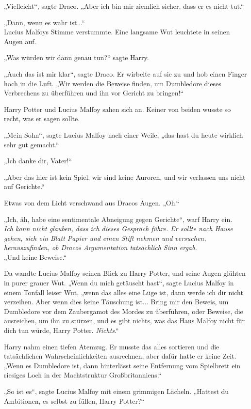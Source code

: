 {„Vielleicht“, sagte Draco. „Aber ich bin mir ziemlich sicher, dass er es nicht tut.“

„Dann, wenn es wahr ist...“\\ Lucius Malfoys Stimme verstummte. Eine langsame Wut leuchtete in seinen Augen auf.

„Was würden wir dann genau tun?“ sagte Harry.

„Auch das ist mir klar“, sagte Draco. Er wirbelte auf sie zu und hob einen Finger hoch in die Luft. „Wir werden die Beweise finden, um Dumbledore dieses Verbrechens zu überführen und ihn vor Gericht zu bringen!“

Harry Potter und Lucius Malfoy sahen sich an. Keiner von beiden wusste so recht, was er sagen sollte.

„Mein Sohn“, sagte Lucius Malfoy nach einer Weile, „das hast du heute wirklich sehr gut gemacht.“

„Ich danke dir, Vater!“

„Aber das hier ist kein Spiel, wir sind keine Auroren, und wir verlassen uns nicht auf Gerichte.“

Etwas von dem Licht verschwand aus Dracos Augen. „Oh.“

„Ich, äh, habe eine sentimentale Abneigung gegen Gerichte“, warf Harry ein.\\ \emph{Ich kann nicht glauben, dass ich dieses Gespräch führe. Er sollte nach Hause gehen, sich ein Blatt Papier und einen Stift nehmen und versuchen, herauszufinden, ob Dracos Argumentation tatsächlich Sinn ergab.}\\ „Und keine Beweise.“

Da wandte Lucius Malfoy seinen Blick zu Harry Potter, und seine Augen glühten in purer grauer Wut. „Wenn du mich getäuscht hast“, sagte Lucius Malfoy in einem Tonfall leiser Wut, „wenn das alles eine Lüge ist, dann werde ich dir nicht verzeihen. Aber wenn dies keine Täuschung ist... Bring mir den Beweis, um Dumbledore vor dem Zaubergamot des Mordes zu überführen, oder Beweise, die ausreichen, um ihn zu stürzen, und es gibt nichts, was das Haus Malfoy nicht für dich tun würde, Harry Potter. \emph{Nichts}.“

Harry nahm einen tiefen Atemzug. Er musste das alles sortieren und die tatsächlichen Wahrscheinlichkeiten ausrechnen, aber dafür hatte er keine Zeit.\\ „Wenn es Dumbledore ist, dann hinterlässt seine Entfernung vom Spielbrett ein riesiges Loch in der Machtstruktur Großbritanniens.“

„So ist es“, sagte Lucius Malfoy mit einem grimmigen Lächeln. „Hattest du Ambitionen, es selbst zu füllen, Harry Potter?“

}
